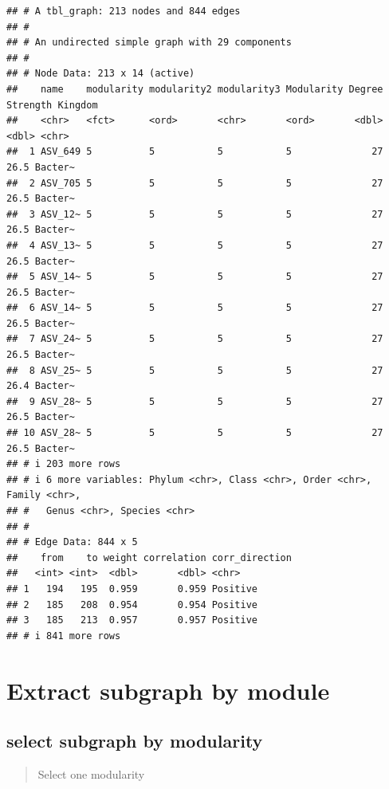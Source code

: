 \documentclass[
]{book}
\begin{document}
\begin{verbatim}
## # A tbl_graph: 213 nodes and 844 edges
## #
## # An undirected simple graph with 29 components
## #
## # Node Data: 213 x 14 (active)
##    name    modularity modularity2 modularity3 Modularity Degree Strength Kingdom
##    <chr>   <fct>      <ord>       <chr>       <ord>       <dbl>    <dbl> <chr>  
##  1 ASV_649 5          5           5           5              27     26.5 Bacter~
##  2 ASV_705 5          5           5           5              27     26.5 Bacter~
##  3 ASV_12~ 5          5           5           5              27     26.5 Bacter~
##  4 ASV_13~ 5          5           5           5              27     26.5 Bacter~
##  5 ASV_14~ 5          5           5           5              27     26.5 Bacter~
##  6 ASV_14~ 5          5           5           5              27     26.5 Bacter~
##  7 ASV_24~ 5          5           5           5              27     26.5 Bacter~
##  8 ASV_25~ 5          5           5           5              27     26.4 Bacter~
##  9 ASV_28~ 5          5           5           5              27     26.5 Bacter~
## 10 ASV_28~ 5          5           5           5              27     26.5 Bacter~
## # i 203 more rows
## # i 6 more variables: Phylum <chr>, Class <chr>, Order <chr>, Family <chr>,
## #   Genus <chr>, Species <chr>
## #
## # Edge Data: 844 x 5
##    from    to weight correlation corr_direction
##   <int> <int>  <dbl>       <dbl> <chr>         
## 1   194   195  0.959       0.959 Positive      
## 2   185   208  0.954       0.954 Positive      
## 3   185   213  0.957       0.957 Positive      
## # i 841 more rows
\end{verbatim}

\section{Extract subgraph by module}\label{extract-subgraph-by-module}

\subsection{select subgraph by modularity}\label{select-subgraph-by-modularity}

\begin{quote}
Select one modularity
\end{quote}
\end{document}
